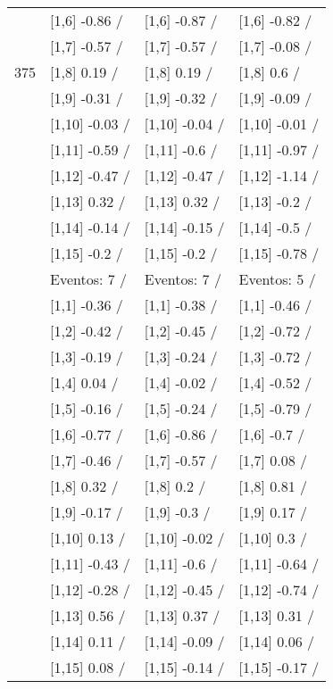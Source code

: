 \begin{table}
\begin{tabular}[t]{llll}
 & {}[1,6] -0.86  / & {}[1,6] -0.87  / & {}[1,6] -0.82  /\\
 & {}[1,7] -0.57  / & {}[1,7] -0.57  / & {}[1,7] -0.08  /\\
375 & {}[1,8] 0.19  / & {}[1,8] 0.19  / & {}[1,8] 0.6  /\\
\addlinespace
 & {}[1,9] -0.31  / & {}[1,9] -0.32  / & {}[1,9] -0.09  /\\
 & {}[1,10] -0.03  / & {}[1,10] -0.04  / & {}[1,10] -0.01  /\\
 & {}[1,11] -0.59  / & {}[1,11] -0.6  / & {}[1,11] -0.97  /\\
 & {}[1,12] -0.47  / & {}[1,12] -0.47  / & {}[1,12] -1.14  /\\
 & {}[1,13] 0.32  / & {}[1,13] 0.32  / & {}[1,13] -0.2  /\\
\addlinespace
 & {}[1,14] -0.14  / & {}[1,14] -0.15  / & {}[1,14] -0.5  /\\
 & {}[1,15] -0.2  / & {}[1,15] -0.2  / & {}[1,15] -0.78  /\\
 & Eventos:  7 / & Eventos:  7 / & Eventos:  5 /\\
 & {}[1,1] -0.36  / & {}[1,1] -0.38  / & {}[1,1] -0.46  /\\
 & {}[1,2] -0.42  / & {}[1,2] -0.45  / & {}[1,2] -0.72  /\\
\addlinespace
 & {}[1,3] -0.19  / & {}[1,3] -0.24  / & {}[1,3] -0.72  /\\
 & {}[1,4] 0.04  / & {}[1,4] -0.02  / & {}[1,4] -0.52  /\\
 & {}[1,5] -0.16  / & {}[1,5] -0.24  / & {}[1,5] -0.79  /\\
 & {}[1,6] -0.77  / & {}[1,6] -0.86  / & {}[1,6] -0.7  /\\
 & {}[1,7] -0.46  / & {}[1,7] -0.57  / & {}[1,7] 0.08  /\\
\addlinespace
500 & {}[1,8] 0.32  / & {}[1,8] 0.2  / & {}[1,8] 0.81  /\\
 & {}[1,9] -0.17  / & {}[1,9] -0.3  / & {}[1,9] 0.17  /\\
 & {}[1,10] 0.13  / & {}[1,10] -0.02  / & {}[1,10] 0.3  /\\
 & {}[1,11] -0.43  / & {}[1,11] -0.6  / & {}[1,11] -0.64  /\\
 & {}[1,12] -0.28  / & {}[1,12] -0.45  / & {}[1,12] -0.74  /\\
\addlinespace
 & {}[1,13] 0.56  / & {}[1,13] 0.37  / & {}[1,13] 0.31  /\\
 & {}[1,14] 0.11  / & {}[1,14] -0.09  / & {}[1,14] 0.06  /\\
 & {}[1,15] 0.08  / & {}[1,15] -0.14  / & {}[1,15] -0.17  /\\
\bottomrule
\end{tabular}
\end{table}
